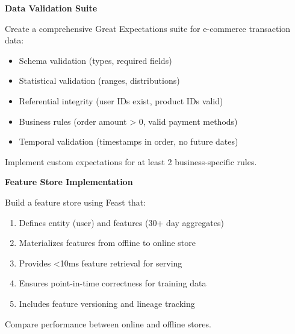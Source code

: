 \begin{exercise}
\textbf{Data Validation Suite}

Create a comprehensive Great Expectations suite for e-commerce transaction data:
\begin{itemize}
    \item Schema validation (types, required fields)
    \item Statistical validation (ranges, distributions)
    \item Referential integrity (user IDs exist, product IDs valid)
    \item Business rules (order amount > 0, valid payment methods)
    \item Temporal validation (timestamps in order, no future dates)
\end{itemize}

Implement custom expectations for at least 2 business-specific rules.
\end{exercise}

\begin{exercise}
\textbf{Feature Store Implementation}

Build a feature store using Feast that:
\begin{enumerate}
    \item Defines entity (user) and features (30+ day aggregates)
    \item Materializes features from offline to online store
    \item Provides <10ms feature retrieval for serving
    \item Ensures point-in-time correctness for training data
    \item Includes feature versioning and lineage tracking
\end{enumerate}

Compare performance between online and offline stores.
\end{exercise}

